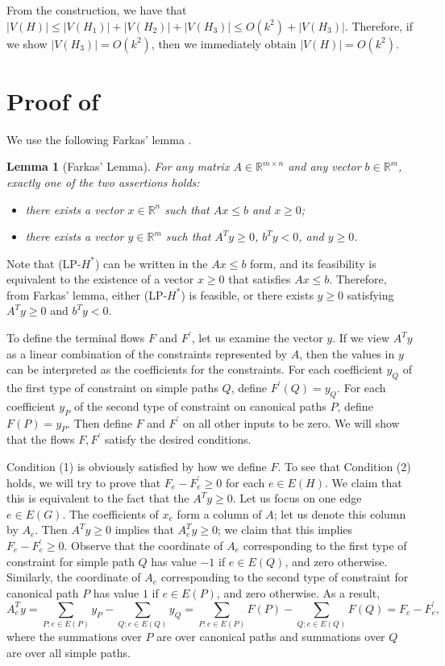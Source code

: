 \documentclass[11pt]{article}
\newtheorem{lemma}[theorem]{Lemma}
\begin{document}
From the construction, we have that $|V(H)|\le |V(H_1)|+|V(H_2)|+|V(H_3)|\le O(k^2)+|V(H_3)|$. Therefore, if we show $|V(H_3)|=O(k^2)$, then we immediately obtain $|V(H)|=O(k^2)$.



\section{Proof of }
\label{apd: Proof of clm: feasibility or flow}

We use the following Farkas' lemma \cite{farkas1898fourier}.
\begin{lemma}[Farkas' Lemma]
For any matrix $A\in \mathbb{R}^{m\times n}$ and any vector $b\in \mathbb{R}^m$, exactly one of the two assertions holds:
\begin{itemize}
\item there exists a vector $x\in \mathbb{R}^n$ such that $Ax\le b$ and $x\ge 0$;
\item there exists a vector $y\in \mathbb{R}^m$ such that $A^Ty\ge 0$, $b^Ty<0$, and $y\ge 0$.
\end{itemize}\label{lem:farkas}
\end{lemma}
    
Note that (LP-$H^*$) can be written in the $Ax\le b$ form, and its feasibility is equivalent to the existence of a vector $x\ge 0$ that satisfies $Ax\le b$. Therefore, from Farkas' lemma, either (LP-$H^*$) is feasible, or there exists $y\ge 0$ satisfying $A^Ty\ge 0$ and $b^Ty<0$. 

To define the terminal flows $F$ and $F^\prime$, let us examine the vector $y$. If we view $A^Ty$ as a linear combination of the constraints represented by $A$, then the values in $y$ can be interpreted as the coefficients for the constraints. For each coefficient $y_Q$ of the first type of constraint on simple paths $Q$, define $F^\prime(Q)=y_Q$. For each coefficient $y_P$ of the second type of constraint on canonical paths $P$, define $F(P)=y_P$. Then define $F$ and $F^\prime$ on all other inputs to be zero. We will show that the flows $F,F^\prime$ satisfy the desired conditions.

    Condition (1) is obviously satisfied by how we define $F$. To see that Condition (2) holds, we will try to prove that $F_e-F^\prime_e\ge 0$ for each $e\in E(H)$. We claim that this is equivalent to the fact that the $A^Ty\ge 0$. Let us focus on one edge $e\in E(G)$. The coefficients of $x_e$ form a column of $A$; let us denote this column by $A_e$. Then $A^Ty\ge 0$ implies that $A^T_ey\ge 0$; we claim that this implies $F_e-F^\prime_e\ge 0$. Observe that the coordinate of $A_e$ corresponding to the first type of constraint for simple path $Q$ has value $-1$ if $e\in E(Q)$, and zero otherwise. Similarly, the coordinate of $A_e$ corresponding to the second type of constraint for canonical path $P$ has value $1$ if $e\in E(P)$, and zero otherwise. As a result,
    $$A_e^Ty=\sum_{P:e\in E(P)}y_P-\sum_{Q:e\in E(Q)}y_Q=\sum_{P:e\in E(P)}F(P)-\sum_{Q:e\in E(Q)}F(Q)=F_e-F^\prime_e,$$
    where the summations over $P$ are over canonical paths and summations over $Q$ are over all simple paths.
\end{document}
